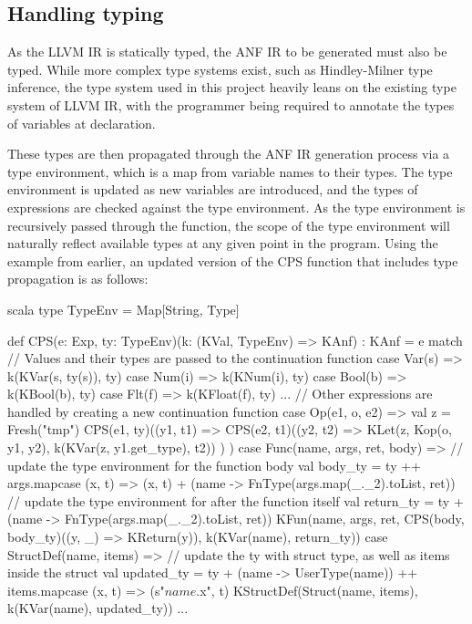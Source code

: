 \subsection{Handling typing}

As the LLVM IR is statically typed, the ANF IR to be generated must also be typed. While more
complex type systems exist, such as Hindley-Milner type inference, the type system used in this
project heavily leans on the existing type system of LLVM IR, with the programmer being required to
annotate the types of variables at declaration.

These types are then propagated through the ANF IR generation process via a type environment, which
is a map from variable names to their types. The type environment is updated as new variables are
introduced, and the types of expressions are checked against the type environment. As the type
environment is recursively passed through the function, the scope of the type environment will
naturally reflect available types at any given point in the program. Using the example from earlier,
an updated version of the CPS function that includes type propagation is as follows:

\begin{code}{scala}
    type TypeEnv = Map[String, Type]

    def CPS(e: Exp, ty: TypeEnv)(k: (KVal, TypeEnv) => KAnf) : KAnf = e match {
        // Values and their types are passed to the continuation function
        case Var(s) => k(KVar(s, ty(s)), ty)
        case Num(i) => k(KNum(i), ty)
        case Bool(b) => k(KBool(b), ty)
        case Flt(f) => k(KFloat(f), ty)
        ...
        // Other expressions are handled by creating a new continuation function
        case Op(e1, o, e2) => {
            val z = Fresh("tmp")
            CPS(e1, ty)((y1, t1) =>
                CPS(e2, t1)((y2, t2) =>
                    KLet(z, Kop(o, y1, y2), k(KVar(z, y1.get_type), t2))
                )
            )
        }
        case Func(name, args, ret, body) => {
            // update the type environment for the function body
            val body_ty = ty
                ++ args.map{case (x, t) => (x, t)}
                + (name -> FnType(args.map(_._2).toList, ret))
            // update the type environment for after the function itself
            val return_ty = ty
                + (name -> FnType(args.map(_._2).toList, ret))
            KFun(name, args, ret, CPS(body, body_ty)((y, _) => KReturn(y)), k(KVar(name), return_ty))
        }
        case StructDef(name, items) =>
            // update the ty with struct type, as well as items inside the struct
            val updated_ty = ty
                + (name -> UserType(name))
                ++ items.map{case (x, t) => (s"$name.$x", t)}
            KStructDef(Struct(name, items), k(KVar(name), updated_ty))
        ...
    }
\end{code}

